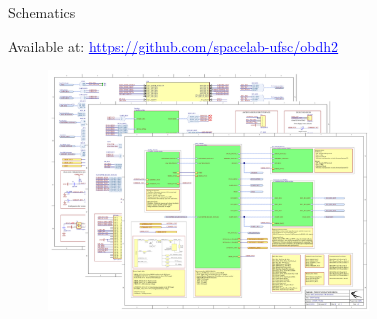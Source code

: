 \begin{frame}{Schematics}

    Available at: \href{https://github.com/spacelab-ufsc/obdh2/tree/master/hardware/outputs/board_schematics}{\textcolor{blue}{\underline{https://github.com/spacelab-ufsc/obdh2}}}

    \begin{figure}[!ht]
        \begin{center}
            \includegraphics[width=8.5cm]{figures/obdh2-schematics.png}
        \end{center}
    \end{figure}

\end{frame}

